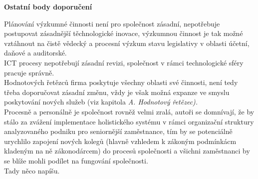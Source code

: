 \noindent\textbf{Ostatní body doporučení}

Plánování výzkumné činnosti není pro společnost zásadní, nepotřebuje postupovat zásadnější těchnologické inovace, výzkumnou činnost je tak možné vztáhnout na čistě vědecký a procesní výzkum stavu legislativy v oblasti účetní, daňové a auditorské.\\

ICT procesy nepotřebují zásadní revizi, společnost v rámci technologické sféry pracuje správně.\\

Hodnotových řetězců firma poskytuje všechny oblasti své činnosti, není tedy třeba doporučovat zásadní změnu, vždy je však možná expanze ve smyslu poskytování nových služeb (viz kapitola \textit{A. Hodnotový řetězec).}\\

Procesně a personálně je společnost rovněž velmi zralá, autoři se domnívají, že by stálo za zvážení implementace holistického systému v rámci organizační struktury analyzovaného podniku pro seniornější zaměstnance, tím by se potenciálně urychlilo zapojení nových kolegů (hlavně vzhledem k zákoným podmínkácm kladeným na ně zákonodárcem) do procesů společnosti a všichni zaměstnanci by se blíže mohli podílet na fungování společnosti.\\



Tady něco napíšu.